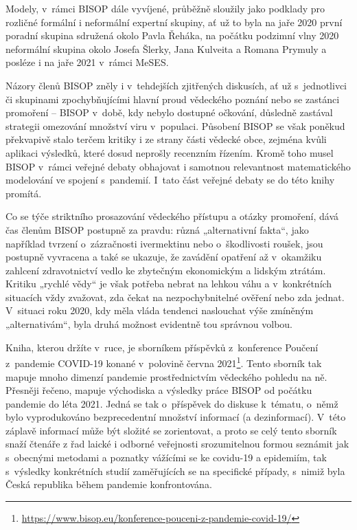  Modely, v~rámci BISOP dále vyvíjené, průběžně sloužily jako podklady pro rozličné formální i neformální expertní skupiny, ať už to byla na jaře 2020 první poradní skupina sdružená okolo Pavla Řeháka, na počátku podzimní vlny 2020 neformální skupina okolo Josefa Šlerky, Jana Kulveita a Romana Prymuly a posléze i na jaře 2021 v~rámci MeSES.

 Názory členů BISOP zněly i v~tehdejších zjitřených diskusích, ať už s~jednotlivci či skupinami zpochybňujícími hlavní proud vědeckého poznání nebo se zastánci promoření -- BISOP v~době, kdy nebylo dostupné očkování, důsledně zastával strategii omezování množství viru v~populaci. Působení BISOP se však poněkud překvapivě stalo terčem kritiky i ze strany části vědecké obce, zejména kvůli aplikaci výsledků, které dosud neprošly recenzním řízením. Kromě toho musel BISOP v~rámci veřejné debaty obhajovat i samotnou relevantnost matematického modelování ve spojení s~pandemií. I~tato část veřejné debaty se do této knihy promítá.

 Co se týče striktního prosazování vědeckého přístupu a otázky promoření, dává čas členům BISOP postupně za pravdu: různá „alternativní fakta“, jako například tvrzení o~zázračnosti ivermektinu nebo o~škodlivosti roušek, jsou postupně vyvracena a také se ukazuje, že zavádění opatření až v~okamžiku zahlcení zdravotnictví vedlo ke zbytečným ekonomickým a lidským ztrátám. Kritiku „rychlé vědy“ je však potřeba nebrat na lehkou váhu a v~konkrétních situacích vždy zvažovat, zda čekat na nezpochybnitelné ověření nebo zda jednat. V~situaci roku 2020, kdy měla vláda tendenci naslouchat výše zmíněným „alternativám“, byla druhá možnost evidentně tou správnou volbou.


 Kniha, kterou držíte v~ruce, je sborníkem příspěvků z~konference Poučení z~pandemie COVID-19 konané v~polovině června 2021\footnote{\url{https://www.bisop.eu/konference-pouceni-z-pandemie-covid-19/}}. Tento sborník tak mapuje mnoho dimenzí pandemie prostřednictvím vědeckého pohledu na ně. Přesněji řečeno, mapuje východiska a výsledky práce BISOP od počátku pandemie do léta 2021. Jedná se tak o~příspěvek do diskuse k~tématu, o~němž bylo vyprodukováno bezprecedentní množství informací (a dezinformací). V~této záplavě informací může být složité se zorientovat, a proto se celý tento sborník snaží čtenáře z řad laické i odborné veřejnosti srozumitelnou formou seznámit jak s~obecnými metodami a poznatky vážícími se ke covidu-19 a epidemiím, tak s~výsledky konkrétních studií zaměřujících se na specifické případy, s~nimiž byla Česká republika během pandemie konfrontována.


